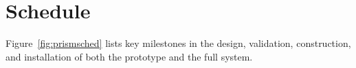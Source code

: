 %


\section{Schedule}
\label{sec:prism-org-sched}

Figure~\ref{fig:prismsched} lists key milestones in the design, validation, construction, and installation of both the prototype and the full  system.






